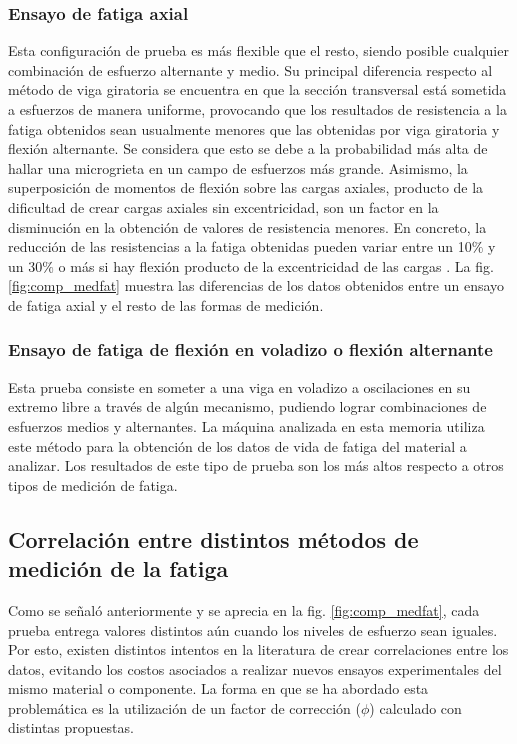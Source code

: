 \subsubsection{Ensayo de fatiga axial}
Esta configuración de prueba es más flexible que el resto, siendo posible cualquier combinación de esfuerzo alternante y medio\cite{norton2011machine}. Su principal diferencia respecto al método de viga giratoria se encuentra en que la sección transversal está sometida a esfuerzos de manera uniforme, provocando que los resultados de resistencia a la fatiga obtenidos sean usualmente menores que las obtenidas por viga giratoria y flexión alternante. Se considera que esto se debe a la  probabilidad más alta de hallar una microgrieta en un campo de esfuerzos más grande. Asimismo, la superposición de momentos de flexión sobre las cargas axiales, producto de la dificultad de crear cargas axiales sin excentricidad, son un factor en la disminución en la obtención de valores de resistencia menores. En concreto, la reducción de las resistencias a la fatiga obtenidas pueden variar entre un 10$\%$ y un 30$\%$ o más si hay flexión producto de la excentricidad de las cargas \cite{bannantine1990fundamentals}. La fig. \ref{fig:comp_medfat} muestra las diferencias de los datos obtenidos entre un ensayo de fatiga axial y el resto de las formas de medición.

\subsubsection{Ensayo de fatiga de flexión en voladizo o flexión alternante}
Esta prueba consiste en someter a una viga en voladizo a oscilaciones en su extremo libre a través de algún mecanismo, pudiendo lograr combinaciones de esfuerzos medios y alternantes. La máquina analizada en esta memoria utiliza este método para la obtención de los datos de vida de fatiga del material a analizar. Los resultados de este tipo de prueba son los más altos respecto a otros tipos de medición de fatiga.

\subsection{Correlación entre distintos métodos de medición de la fatiga}
Como se señaló anteriormente y se aprecia en la fig. \ref{fig:comp_medfat}, cada prueba entrega valores distintos aún cuando los niveles de esfuerzo sean iguales. Por esto, existen distintos intentos en la literatura de crear correlaciones entre los datos, evitando los costos asociados a realizar nuevos ensayos experimentales del mismo material o componente. La forma en que se ha abordado esta problemática es la utilización de un factor de corrección ($\phi$) calculado con distintas propuestas.

